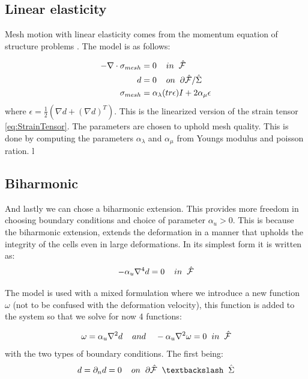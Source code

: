 \subsection{Linear elasticity}
Mesh motion with linear elasticity comes from the momentum equation of structure problems \cite{Wick2011a}. The model is as follows:

\begin{align}
-\nabla \cdot \sigma_{mesh} &= 0 \hspace{4mm} in \hspace{2mm} \hat{\mathcal{F}}\\
\hspace{4mm} d &= 0 \hspace{4mm } on \hspace{2mm }  \partial \hat{\mathcal{F}} / \hat{\Sigma} \\
\sigma_{mesh} &= \alpha_\lambda (tr\epsilon)I + 2\alpha_\mu \epsilon 
\end{align}
where $\epsilon = \frac{1}{2}(\nabla d + (\nabla d)^T)$. This is the linearized version of the strain tensor \eqref{eq:StrainTensor}. The parameters are chosen to uphold mesh quality. This is done by computing the parameters $\alpha_\lambda$ and $\alpha_\mu$ from Youngs modulus and poisson ration. l

\subsection{Biharmonic} 
And lastly we can chose a biharmonic extension. This provides more freedom in choosing boundary conditions and choice of parameter $\alpha_u > 0$. This is because the biharmonic extension, extends the deformation in a manner that upholds the integrity of the cells even in large deformations. In its simplest form it is written as:
\begin{equation}
- \alpha_u \nabla^4 d = 0 \hspace{4mm}  in \hspace{2mm} \hat{\mathcal{F}}\\
\end{equation}

The model is used with a mixed formulation where we introduce a new function $\omega$ (not to be confused with the deformation velocity), this function is added to the system so that we solve for now 4 functions:

\begin{equation}
\omega = \alpha_u \nabla^2 d \hspace{4mm} and \hspace{4mm} - \alpha_u \nabla^2 \omega = 0 \hspace{2mm}   in \hspace{2mm} \hat{\mathcal{F}}
\end{equation}
with the two types of boundary conditions. The first being:
\begin{equation}
d = \partial_n d = 0 \hspace{4mm} on \hspace{2mm} \partial \hat{\mathcal{F}} \hspace{2mm} \textbackslash \hspace{2mm} \hat{\Sigma}
\end{equation}

